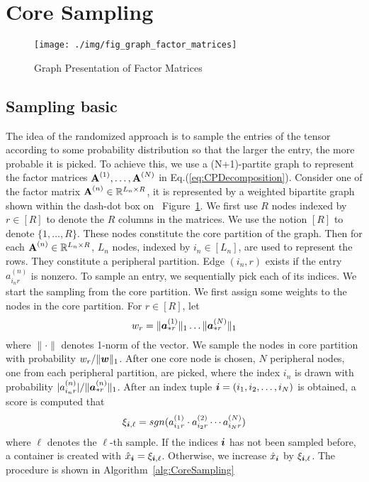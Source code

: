 \documentclass[letterpaper]{article}
\newcommand{\Sca}[3]{{#1}^{(#2)}_{i_#2#3}}%
\newcommand{\anr}[2]{\Sca{a}{#1}{#2}}
\newcommand{\score}[1]{\xi_{\V{i},#1}}
\newcommand{\V}[1]{{\boldsymbol{{\MakeLowercase{#1}}}}}
\newcommand{\ColVec}[3]{\V{#1}^{(#2)}_{#3}}
\newcommand{\NormColA}[2]{\norm{\ColVec{a}{#1}{*#2}}{1}}
\newcommand{\ColVecA}[1]{\V{a}^{(#1)}_{*r}}
\newcommand{\coord}{(i_1,i_2,\ldots,i_N)}
\newcommand{\WeightR}{\NormColA{1}{r}\ldots\NormColA{N}{r}}
\newcommand{\predx}{\hat{x}_{\V{i}}}
\newcommand{\M}[1]{{\textbf{{\MakeUppercase{#1}}}}}
\newcommand{\FacMat}[2]{\M{#1}^{(#2)}}
\newcommand{\norm}[2]{\|#1\|_{#2}}
\newcommand{\Eqn}[1]{Eq.(\ref{eq:#1})}
\newcommand{\Fig}[1]{Figure~\ref{fig:#1}}
\newcommand{\Alg}[1]{Algorithm~\ref{alg:#1}}
\begin{document}
\section{Core Sampling}
\begin{figure}[t]
  \centering
  \texttt{[image: ./img/fig\_graph\_factor\_matrices]}\\
  \caption{Graph Presentation of Factor Matrices}
  \label{fig:GraphMatrices}
\end{figure}
\subsection{Sampling basic}
The idea of the randomized approach is 
to sample the entries of the tensor according to some probability distribution 
so that the larger the entry, the more probable it is picked. 
To achieve this, we use a (N+1)-partite graph to represent the factor matrices
$\FacMat{A}{1},\ldots,\FacMat{A}{N}$ in \Eqn{CPDecomposition}.
Consider one of the factor matrix $\FacMat{A}{n}\in \mathbb{R}^{L_n \times R}$,
it is represented by a weighted bipartite graph shown within the dash-dot box on ~\Fig{GraphMatrices}.
We first use $R$ nodes indexed by $r\in[R]$ to denote the $R$ columns in the matrices. 
We use the notion $[R]$ to denote $\{1,\ldots,R\}$. 
These nodes constitute the core partition of the graph. 
Then for each $\FacMat{A}{n}\in\mathbb{R}^{L_n\times R}$, $L_n$ nodes, 
indexed by $i_n\in[L_n]$, are used to represent the rows. 
They constitute a peripheral partition. 
Edge $(i_n,r)$ exists if the entry $\anr{n}{r}$ is nonzero.
To sample an entry, we sequentially pick each of its indices. 
We start the sampling from the core partition. 
We first assign some weights to the nodes in the core partition. 
For $r\in[R]$, let
\[
    w_r = \WeightR
\]
where $\|\cdot\|$ denotes 1-norm of the vector.
We sample the nodes in core partition with probability $w_r/\norm{\V{W}}{1}$. 
After one core node is chosen, 
$N$ peripheral nodes, one from each peripheral partition, are picked, 
where the index $i_n$ is drawn with probability $|\anr{n}{r}|/\norm{\ColVecA{n}}{1}$. 
After an index tuple $\V{i}=\coord$ is obtained, 
a score is computed that
\[
\score{\ell}  = sgn(\anr{1}{r}\cdot\anr{2}{r}\cdots\anr{N}{r})
\]
where $\ell$ denotes the $\ell$-th sample. 
If the indices $\V{i}$ has not been sampled before, 
a container is created with $\predx = \score{\ell}$. 
Otherwise, we increase $\predx$ by $\score{\ell}$. 
The procedure is shown in \Alg{CoreSampling}
\end{document}
